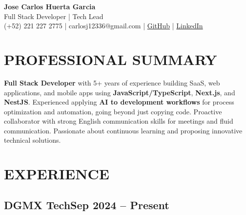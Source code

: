 \documentclass[a4paper,10pt]{article}
\newcommand{\kw}[1]{\textbf{\textcolor{keyword}{#1}}}
\begin{document}
\begin{center}
{\bfseries\LARGE Jose Carlos Huerta Garcia} \\
Full Stack Developer | Tech Lead \\
(+52) 221 227 2775 | carlosj12336@gmail.com | \href{https://github.com/jcarloshg}{GitHub} | \href{https://www.linkedin.com/in/jose-carlos-huerta-garcia-773952212}{LinkedIn}
\end{center}

\section*{PROFESSIONAL SUMMARY}
\kw{Full Stack Developer} with 5+ years of experience building SaaS, web applications, and mobile apps using \kw{JavaScript/TypeScript}, \kw{Next.js}, and \kw{NestJS}. Experienced applying \kw{AI to development workflows} for process optimization and automation, going beyond just copying code. Proactive collaborator with strong English communication skills for meetings and fluid communication. Passionate about continuous learning and proposing innovative technical solutions.

\section*{EXPERIENCE}

\subsection*{DGMX Tech\hfill\textbf{Sep 2024 -- Present}}
\end{document}
